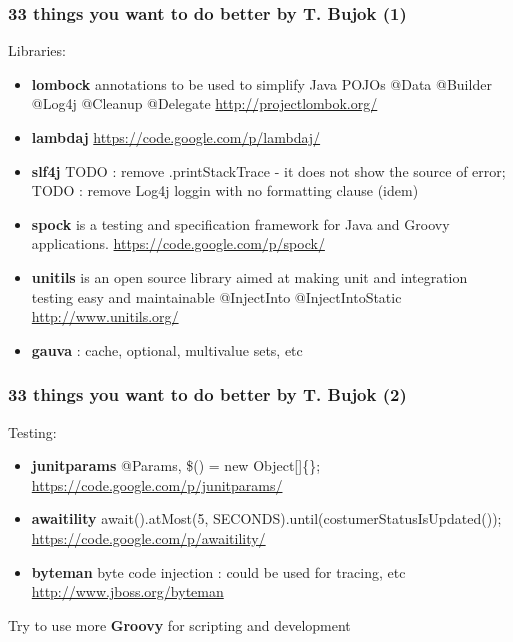 \documentclass[presentation]{beamer}
\begin{document}
\begin{frame}
\frametitle{33 things you want to do better by T. Bujok (1)}

Libraries:
\begin{itemize}
\item \textbf{lombock} annotations to be used to simplify Java POJOs
@Data @Builder @Log4j @Cleanup @Delegate
\url{http://projectlombok.org/}
\item \textbf{lambdaj}
\url{https://code.google.com/p/lambdaj/}
\item \textbf{slf4j} TODO : remove .printStackTrace - it does not show the source of error; TODO : remove Log4j loggin with no formatting clause (idem)
\item \textbf{spock} is a testing and specification framework for Java and Groovy applications.
\url{https://code.google.com/p/spock/}
\item \textbf{unitils} is an open source library aimed at making unit and integration testing easy and maintainable
@InjectInto @InjectIntoStatic
\url{http://www.unitils.org/}
\item \textbf{gauva} : cache, optional, multivalue sets, etc
\end{itemize}

\end{frame}

\begin{frame}
\frametitle{33 things you want to do better by T. Bujok (2)}

Testing:
\begin{itemize}
\item \textbf{junitparams} @Params, \$() = new Object[]\{\};
\url{https://code.google.com/p/junitparams/}
\item \textbf{awaitility} await().atMost(5, SECONDS).until(costumerStatusIsUpdated());
\url{https://code.google.com/p/awaitility/}
\item \textbf{byteman} byte code injection : could be used for tracing, etc
\url{http://www.jboss.org/byteman}
\end{itemize}

Try to use more \textbf{Groovy} for scripting and development

\end{frame}
\end{document}
